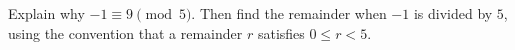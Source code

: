 Explain why $-1\equiv9\pmod5$. Then find the remainder when $-1$ is divided by $5$, using the convention that a remainder $r$ satisfies $0\le r<5$.
